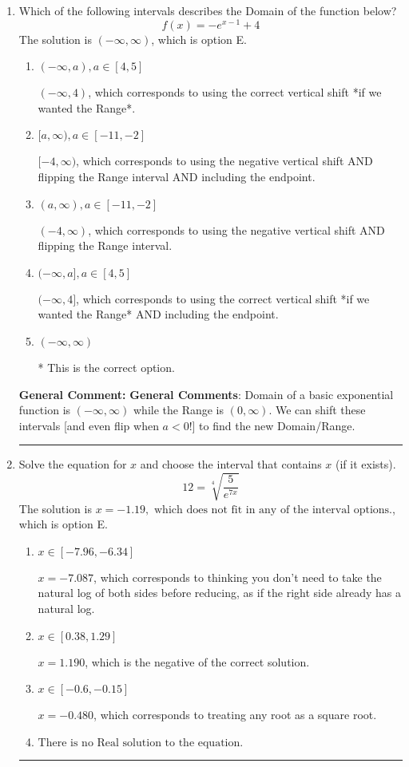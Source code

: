 \documentclass{extbook}[14pt]
\newcommand{\litem}[1]{\item #1

\rule{\textwidth}{0.4pt}}
\begin{document}
\begin{enumerate}\litem{
Which of the following intervals describes the Domain of the function below?
\[ f(x) = -e^{x-1}+4 \]The solution is \( (-\infty, \infty) \), which is option E.\begin{enumerate}[label=\Alph*.]
\item \( (-\infty, a), a \in [4, 5] \)

$(-\infty, 4)$, which corresponds to using the correct vertical shift *if we wanted the Range*.
\item \( [a, \infty), a \in [-11, -2] \)

$[-4, \infty)$, which corresponds to using the negative vertical shift AND flipping the Range interval AND including the endpoint.
\item \( (a, \infty), a \in [-11, -2] \)

$(-4, \infty)$, which corresponds to using the negative vertical shift AND flipping the Range interval.
\item \( (-\infty, a], a \in [4, 5] \)

$(-\infty, 4]$, which corresponds to using the correct vertical shift *if we wanted the Range* AND including the endpoint.
\item \( (-\infty, \infty) \)

* This is the correct option.
\end{enumerate}

\textbf{General Comment:} \textbf{General Comments}: Domain of a basic exponential function is $(-\infty, \infty)$ while the Range is $(0, \infty)$. We can shift these intervals [and even flip when $a<0$!] to find the new Domain/Range.
}
\litem{
 Solve the equation for $x$ and choose the interval that contains $x$ (if it exists).
\[  12 = \sqrt[4]{\frac{5}{e^{7x}}} \]The solution is \( x = -1.19, \text{ which does not fit in any of the interval options.} \), which is option E.\begin{enumerate}[label=\Alph*.]
\item \( x \in [-7.96, -6.34] \)

$x = -7.087$, which corresponds to thinking you don't need to take the natural log of both sides before reducing, as if the right side already has a natural log.
\item \( x \in [0.38, 1.29] \)

$x = 1.190$, which is the negative of the correct solution.
\item \( x \in [-0.6, -0.15] \)

$x = -0.480$, which corresponds to treating any root as a square root.
\item \( \text{There is no Real solution to the equation.} \)


\end{enumerate}}
\end{enumerate}
\end{document}
